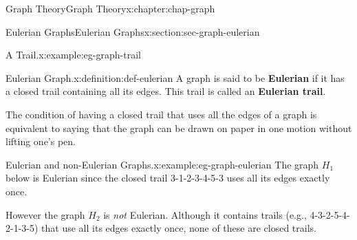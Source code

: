 \documentclass[oneside,10pt,]{book}
\newcommand{\terminology}[1]{\textbf{#1}}
\numberwithin{equation}{section}
\begin{document}
\begin{chapterptx}{Graph Theory}{}{Graph Theory}{}{}{x:chapter:chap-graph}
\begin{sectionptx}{Eulerian Graphs}{}{Eulerian Graphs}{}{}{x:section:sec-graph-eulerian}
\begin{example}{A Trail.}{x:example:eg-graph-trail}
\begin{sidebyside}{1}{0.325}{0.325}{0}
\begin{sbspanel}{0.35}
{
}%
\end{sbspanel}%
\end{sidebyside}%
\end{example}
\begin{definition}{Eulerian Graph.}{x:definition:def-eulerian}%
A graph is said to be \terminology{Eulerian} if it has a closed trail containing all its edges. This trail is called an \terminology{Eulerian trail}.%
\end{definition}
The condition of having a closed trail that uses all the edges of a graph is equivalent to saying that the graph can be drawn on paper in one motion without lifting one's pen.%
\begin{example}{Eulerian and non-Eulerian Graphs.}{x:example:eg-graph-eulerian}%
The graph \(H_1\) below is Eulerian since the closed trail 3-1-2-3-4-5-3 uses all its edges exactly once.%
\par
However the graph \(H_2\) is \emph{not} Eulerian. Although it contains trails (e.g.\@, 4-3-2-5-4-2-1-3-5) that use all its edges exactly once, none of these are closed trails.%
\begin{sidebyside}{2}{0.17}{0.17}{0.23}%
\begin{sbspanel}{0.18}%
\end{sbspanel}
\end{sidebyside}
\end{example}
\end{sectionptx}
\end{chapterptx}
\end{document}
